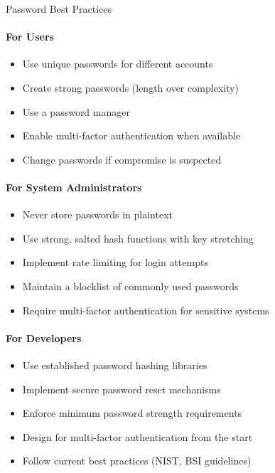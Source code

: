 \begin{KR}{Password Best Practices}\\
\paragraph{For Users}
\begin{itemize}
    \item Use unique passwords for different accounts
    \item Create strong passwords (length over complexity)
    \item Use a password manager
    \item Enable multi-factor authentication when available
    \item Change passwords if compromise is suspected
\end{itemize}

\paragraph{For System Administrators}
\begin{itemize}
    \item Never store passwords in plaintext
    \item Use strong, salted hash functions with key stretching
    \item Implement rate limiting for login attempts
    \item Maintain a blocklist of commonly used passwords
    \item Require multi-factor authentication for sensitive systems
\end{itemize}

\paragraph{For Developers}
\begin{itemize}
    \item Use established password hashing libraries
    \item Implement secure password reset mechanisms
    \item Enforce minimum password strength requirements
    \item Design for multi-factor authentication from the start
    \item Follow current best practices (NIST, BSI guidelines)
\end{itemize}
\end{KR}

